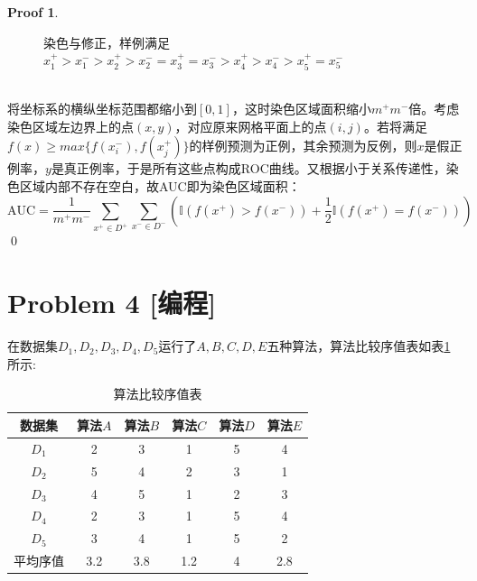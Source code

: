\documentclass[a4paper,UTF8]{article}
\theoremstyle{definition}
\newtheorem*{prove}{Proof}
\begin{document}
\begin{prove}
\begin{figure}[h]
	\caption{染色与修正，样例满足$x_1^+>x_1^->x_2^+>x_2^-=x_3^+=x_3^->x_4^+>x_4^->x_5^+=x_5^-$}
\end{figure}\\
将坐标系的横纵坐标范围都缩小到$[0,1]$，这时染色区域面积缩小$m^+m^-$倍。考虑染色区域左边界上的点$(x,y)$，对应原来网格平面上的点$(i,j)$。若将满足$f(x)\geq max\{f(x_i^-),f(x_j^+)\}$的样例预测为正例，其余预测为反例，则$x$是假正例率，$y$是真正例率，于是所有这些点构成ROC曲线。又根据小于关系传递性，染色区域内部不存在空白，故AUC即为染色区域面积：
\[
\text{AUC} = \frac{1}{m^+m^-}\sum_{x^+\in D^+}\sum_{x^-\in D^-}\left(\mathbb{I}(f(x^+)>f(x^-))+\frac{1}{2}\mathbb{I}(f(x^+)=f(x^-))\right)
\]
\qed
\end{prove}

\section*{Problem 4 [编程]} 
在数据集$D_1,D_2,D_3,D_4,D_5$运行了$A,B,C,D,E$五种算法，算法比较序值表如表\ref{table:ranking}所示:
\begin{table}[h]
\centering
\caption{算法比较序值表} \vspace{2mm}\label{table:ranking}
\begin{tabular}{c|c c c c c}\hline
数据集 & 算法$A$ & 算法$B$  & 算法$C$  &算法$D$  &算法$E$ \\
\hline
$D_1$ & 2  & 3 &  1 &  5  & 4\\
$D_2$ & 5  & 4 &  2 &  3  & 1\\
$D_3$ & 4  & 5 &  1 &  2  & 3\\
$D_4$ & 2  & 3 &  1 &  5  & 4\\
$D_5$ & 3  & 4 &  1 &  5  & 2\\
\hline
平均序值 & 3.2 &  3.8 & 1.2 &  4 &  2.8 \\
\hline
\end{tabular}
\end{table}
\end{document}
